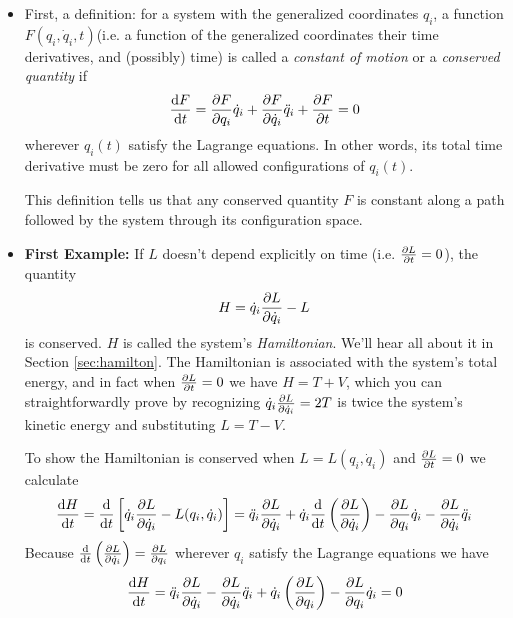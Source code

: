 \documentclass[11pt, a4paper]{article}
\begin{document}
\begin{itemize}
	\item First, a definition: for a system with the generalized coordinates $ q_i $, a function $ F(q_i, \dot q_i, t) $(i.e. a function of the generalized coordinates their time derivatives, and (possibly) time) is called a \textit{constant of motion} or a \textit{conserved quantity} if
	\begin{equation*}
		\dv{F}{t} = \pdv{F}{q_i}\dot{q}_i + \pdv{F}{\dot{q}_i}\ddot{q}_i + \pdv{F}{t} = 0
	\end{equation*}
	wherever $ q_{i}(t) $ satisfy the Lagrange equations. In other words, its total time derivative must be zero for all allowed configurations of $ q_{i}(t) $. 
	
	This definition tells us that any conserved quantity $ F $ is constant along a path followed by the system through its configuration space.
	
	\item \textbf{First Example:} If $ L $ doesn't depend explicitly on time (i.e. $ \pdv{L}{t} = 0 $), the quantity 
	\begin{equation*}
		H = \dot{q}_{i}\pdv{L}{\dot{q}_{i}} - L
	\end{equation*}
	is conserved. $ H $ is called the system's \textit{Hamiltonian}.  We'll hear all about it in Section \ref{sec:hamilton}. The Hamiltonian is associated with the system's total energy, and in fact when $ \pdv{L}{t} = 0  $ we have $ H = T + V $, which you can straightforwardly prove by recognizing $ \dot{q}_{i}\pdv{L}{\dot{q}_{i}} = 2T $ is twice the system's kinetic energy and substituting $ L = T- V $. 
	
	To show the Hamiltonian is conserved when $ L = L(q_i, \dot{q}_i) $  and  $\pdv{L}{t} = 0 $ we calculate
	\begin{equation*}
		\dv{H}{t} = \dv{}{t}\left[\dot{q}_i \pdv{L}{\dot{q}_i} - L(q_i, \dot{q}_i) \right] = \ddot{q}_{i} \pdv{L}{\dot{q}_i}  + \dot{q}_i\dv{}{t}\left( \pdv{L}{\dot{q}_i}\right) - \pdv{L}{q_{i}}\dot{q}_{i} - \pdv{L}{\dot{q}_{i}}\ddot{q}_{i}
	\end{equation*}
	Because $ \dv{}{t}\left( \pdv{L}{\dot{q}_i}\right) = \pdv{L}{q_i} $ wherever $ q_{i} $ satisfy the Lagrange equations we have
	\begin{equation*}
		\dv{H}{t} = \ddot{q}_{i} \pdv{L}{\dot{q}_i} - \pdv{L}{\dot{q}_{i}}\ddot{q}_{i} + \dot{q}_i\left(\pdv{L}{q_{i}}\right) - \pdv{L}{q_{i}}\dot{q}_{i} = 0
	\end{equation*}	
	

\end{itemize}
\end{document}
